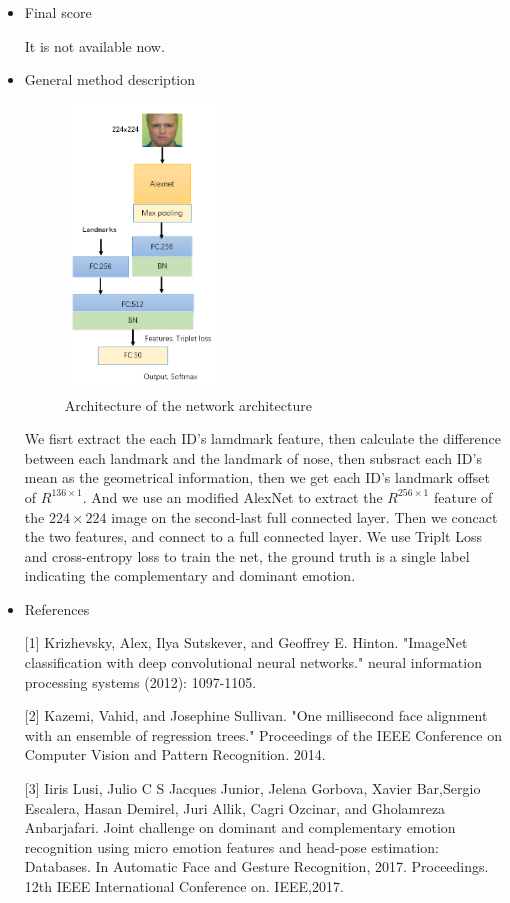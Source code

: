 \documentclass{article}
\begin{document}
\begin{itemize}

\item Final score

It is not available now.

\item General method description

\begin{figure}
\centering
\includegraphics[width=4cm]{Net.PNG}
\caption{Architecture of the network architecture}
\label{fig:architecture}
\end{figure}

We fisrt extract the each ID's lamdmark feature, then calculate the difference between each landmark and the landmark of nose, then subsract each ID's mean as the geometrical information, then we get each ID's landmark offset of $R^{136\times1}$. And we use an modified AlexNet to extract the $R^{256\times1}$ feature of the $224\times224$ image on the second-last full connected layer. Then we concact the two features, and connect to a full connected layer. We use Triplt Loss and cross-entropy loss to train the net, the ground truth is a single label indicating the complementary and dominant emotion.

\item References

[1] Krizhevsky, Alex, Ilya Sutskever, and Geoffrey E. Hinton. "ImageNet classification with deep convolutional neural networks." neural information processing systems (2012): 1097-1105.

[2] Kazemi, Vahid, and Josephine Sullivan. "One millisecond face alignment with an ensemble of regression trees." Proceedings of the IEEE Conference on Computer Vision and Pattern Recognition. 2014.

[3] Iiris Lusi, Julio C S Jacques Junior, Jelena Gorbova, Xavier Bar,Sergio Escalera, Hasan Demirel, Juri Allik, Cagri Ozcinar, and Gholamreza Anbarjafari. Joint challenge on dominant and complementary emotion recognition using micro emotion features and head-pose estimation: Databases. In Automatic Face and Gesture Recognition, 2017. Proceedings. 12th IEEE International Conference on. IEEE,2017.


\end{itemize}
\end{document}
